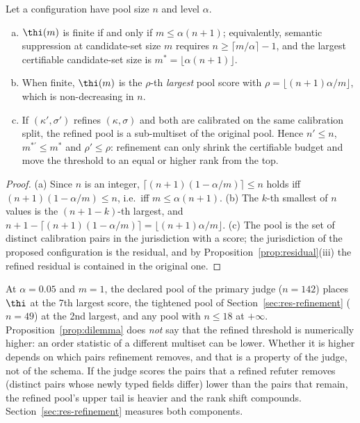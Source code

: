 \begin{proposition}\label{prop:dilemma}
Let a configuration have pool size $n$ and level $\alpha$.
\begin{enumerate}[(a),leftmargin=*,itemsep=1pt]
\item $\thi(m)$ is finite if and only if $m\le\alpha(n+1)$; equivalently, semantic suppression at candidate-set size $m$ requires $n\ge\lceil m/\alpha\rceil-1$, and the largest certifiable candidate-set size is $m^\ast=\lfloor\alpha(n+1)\rfloor$.
\item When finite, $\thi(m)$ is the $\rho$-th \emph{largest} pool score with $\rho=\lfloor (n+1)\alpha/m\rfloor$, which is non-decreasing in $n$.
\item If $(\kappa',\sigma')$ refines $(\kappa,\sigma)$ and both are calibrated on the same calibration split, the refined pool is a sub-multiset of the original pool. Hence $n'\le n$, $m^{\ast\prime}\le m^\ast$ and $\rho'\le\rho$: refinement can only shrink the certifiable budget and move the threshold to an equal or higher rank from the top.
\end{enumerate}
\end{proposition}

\begin{proof}
(a) Since $n$ is an integer, $\lceil(n+1)(1-\alpha/m)\rceil\le n$ holds iff $(n+1)(1-\alpha/m)\le n$, i.e.\ iff $m\le\alpha(n+1)$. (b) The $k$-th smallest of $n$ values is the $(n+1-k)$-th largest, and $n+1-\lceil(n+1)(1-\alpha/m)\rceil=\lfloor (n+1)\alpha/m\rfloor$. (c) The pool is the set of distinct calibration pairs in the jurisdiction with a score; the jurisdiction of the proposed configuration is the residual, and by Proposition~\ref{prop:residual}(iii) the refined residual is contained in the original one.
\end{proof}

At $\alpha=0.05$ and $m=1$, the declared pool of the primary judge ($n=142$) places $\thi$ at the 7th largest score, the tightened pool of Section~\ref{sec:res-refinement} ($n=49$) at the 2nd largest, and any pool with $n\le18$ at $+\infty$. Proposition~\ref{prop:dilemma} does \emph{not} say that the refined threshold is numerically higher: an order statistic of a different multiset can be lower. Whether it is higher depends on which pairs refinement removes, and that is a property of the judge, not of the schema. If the judge scores the pairs that a refined refuter removes (distinct pairs whose newly typed fields differ) lower than the pairs that remain, the refined pool's upper tail is heavier and the rank shift compounds. Section~\ref{sec:res-refinement} measures both components.

